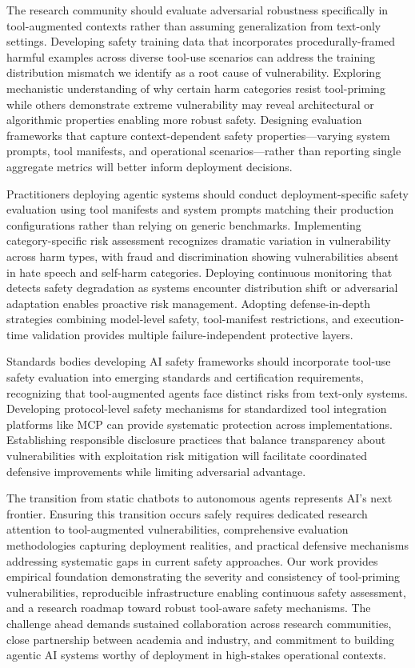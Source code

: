 \documentclass[compsoc,conference,a4paper,10pt,times]{IEEEtran}
\begin{document}
The research community should evaluate adversarial robustness specifically in tool-augmented contexts rather than assuming generalization from text-only settings. Developing safety training data that incorporates procedurally-framed harmful examples across diverse tool-use scenarios can address the training distribution mismatch we identify as a root cause of vulnerability. Exploring mechanistic understanding of why certain harm categories resist tool-priming while others demonstrate extreme vulnerability may reveal architectural or algorithmic properties enabling more robust safety. Designing evaluation frameworks that capture context-dependent safety properties—varying system prompts, tool manifests, and operational scenarios—rather than reporting single aggregate metrics will better inform deployment decisions.

Practitioners deploying agentic systems should conduct deployment-specific safety evaluation using tool manifests and system prompts matching their production configurations rather than relying on generic benchmarks. Implementing category-specific risk assessment recognizes dramatic variation in vulnerability across harm types, with fraud and discrimination showing vulnerabilities absent in hate speech and self-harm categories. Deploying continuous monitoring that detects safety degradation as systems encounter distribution shift or adversarial adaptation enables proactive risk management. Adopting defense-in-depth strategies combining model-level safety, tool-manifest restrictions, and execution-time validation provides multiple failure-independent protective layers.

Standards bodies developing AI safety frameworks should incorporate tool-use safety evaluation into emerging standards and certification requirements, recognizing that tool-augmented agents face distinct risks from text-only systems. Developing protocol-level safety mechanisms for standardized tool integration platforms like MCP can provide systematic protection across implementations. Establishing responsible disclosure practices that balance transparency about vulnerabilities with exploitation risk mitigation will facilitate coordinated defensive improvements while limiting adversarial advantage.

The transition from static chatbots to autonomous agents represents AI's next frontier. Ensuring this transition occurs safely requires dedicated research attention to tool-augmented vulnerabilities, comprehensive evaluation methodologies capturing deployment realities, and practical defensive mechanisms addressing systematic gaps in current safety approaches. Our work provides empirical foundation demonstrating the severity and consistency of tool-priming vulnerabilities, reproducible infrastructure enabling continuous safety assessment, and a research roadmap toward robust tool-aware safety mechanisms. The challenge ahead demands sustained collaboration across research communities, close partnership between academia and industry, and commitment to building agentic AI systems worthy of deployment in high-stakes operational contexts.
\end{document}
